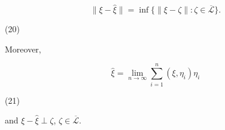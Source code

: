 $$\|\xi - \hat{\xi}\| = \inf \{ \|\xi - \zeta\| : \zeta \in \overline{\mathcal{L}} \}.$$  

(20)

Moreover,

$$\hat{\xi} = \lim_{n \to \infty} \sum_{i=1}^{n} (\xi, \eta_i) \eta_i$$  

(21)

and $\xi - \hat{\xi} \perp \zeta$, $\zeta \in \overline{\mathcal{L}}$.
